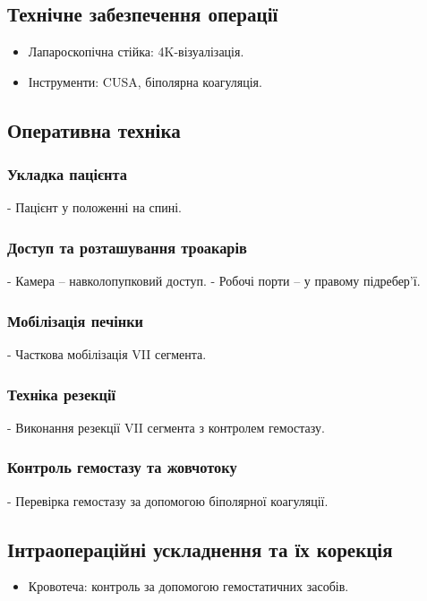 \begin{refsection}
\subsection{Технічне забезпечення операції}
\begin{itemize}
    \item Лапароскопічна стійка: 4K-візуалізація.
    \item Інструменти: CUSA, біполярна коагуляція.
\end{itemize}

\subsection{Оперативна техніка}
\subsubsection{Укладка пацієнта}
- Пацієнт у положенні на спині.

\subsubsection{Доступ та розташування троакарів}
- Камера – навколопупковий доступ.
- Робочі порти – у правому підребер'ї.

\subsubsection{Мобілізація печінки}
- Часткова мобілізація VII сегмента.

\subsubsection{Техніка резекції}
- Виконання резекції VII сегмента з контролем гемостазу.

\subsubsection{Контроль гемостазу та жовчотоку}
- Перевірка гемостазу за допомогою біполярної коагуляції.

\subsection{Інтраопераційні ускладнення та їх корекція}
\begin{itemize}
    \item Кровотеча: контроль за допомогою гемостатичних засобів.
\end{itemize}


\end{refsection}
